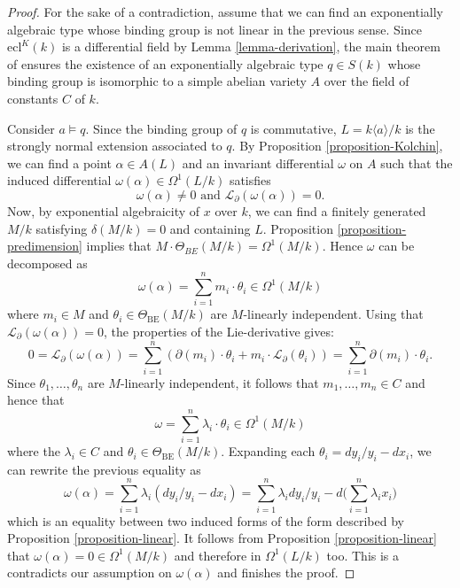 \documentclass[12pt]{amsart}
\newcommand{\BE}{\mathrm{BE}}
\theoremstyle{definition}
\theoremstyle{plain}
\theoremstyle{exampstyle}\newtheorem{thmx}{Theorem}
\theoremstyle{exampstyle}\newtheorem{thmxbis}{Theorem}
\begin{document}
\begin{proof} For the sake of a contradiction, assume that we can find an exponentially algebraic type whose binding group is not linear in the previous sense. Since $\mathrm{ecl}^K(k)$ is a differential field by Lemma \ref{lemma-derivation}, the main theorem of \cite{Jaoui-Moosa} ensures the existence of an exponentially algebraic type $q \in S(k)$ whose binding group is isomorphic to a simple abelian variety $A$ over the field of constants $C$ of $k$. 

Consider $a \models q$. Since the binding group of $q$ is commutative, $L = k\langle a\rangle/k$ is the strongly normal extension associated to $q$. By Proposition \ref{proposition-Kolchin}, we can find a point $\alpha \in A(L)$ and an invariant differential $\omega$ on $A$ such that the induced differential $\omega(\alpha) \in \Omega^1(L/k)$ satisfies 
$$ \omega(\alpha) \neq 0 \text{ and }  \mathcal L_\partial(\omega(\alpha)) = 0.$$
Now, by exponential algebraicity of $x$ over $k$, we can find a finitely generated $M/k$ satisfying $\delta(M/k) = 0$ and containing $L$. Proposition \ref{proposition-predimension} implies that $M \cdot \Theta_{BE}(M/k) = \Omega^1(M/k)$. Hence $\omega$ can be decomposed as
$$ \omega(\alpha) = \sum_{i = 1}^n m_i \cdot  \theta_i \in \Omega^1(M/k)$$
where $m_i \in M$ and $\theta_i \in \Theta_{\BE}(M/k)$ are $M$-linearly independent. Using that $\mathcal L_\partial(\omega(\alpha)) = 0$, the properties of the Lie-derivative gives: 
$$ 0 = \mathcal L_\partial(\omega(\alpha)) = \sum_{i = 1}^n (\partial(m_i) \cdot \theta_i + m_i \cdot \mathcal L_\partial(\theta_i)) = \sum_{i = 1}^n \partial(m_i) \cdot \theta_i .$$
Since $\theta_1,\ldots, \theta_n$ are $M$-linearly independent, it follows that $m_1,\ldots, m_n \in C$ and hence that 
$$ \omega = \sum_{i = 1}^n \lambda_i \cdot  \theta_i \in \Omega^1(M/k)$$
where the $\lambda_i \in C$ and $\theta_i \in \Theta_{\BE}(M/k)$.
 Expanding each $\theta_i = dy_i/y_i - dx_i$, we can rewrite the previous equality as
$$ \omega(\alpha) = \sum_{i = 1}^n \lambda_i (dy_i/y_i - dx_i) = \sum_{i = 1}^n \lambda_i dy_i/y_i - d \Big(\sum_{i = 1}^n \lambda_i x_i\Big) $$
which is an equality between two induced forms of the form described by Proposition \ref{proposition-linear}. It follows from Proposition \ref{proposition-linear} that $\omega(\alpha) = 0 \in \Omega^1(M/k)$ and therefore in $\Omega^1(L/k)$ too. This is a contradicts our assumption on $\omega(\alpha)$ and finishes the proof. 
\end{proof} 
\end{document}
